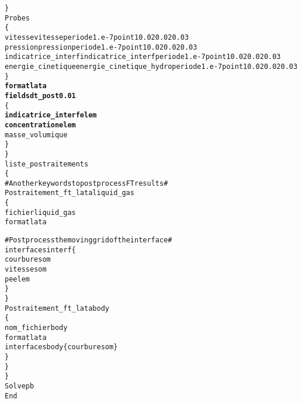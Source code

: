 \begin{alltt}
        \}
        Probes 
        \{
            vitesse vitesse periode 1.e-7 point 1 0.02 0.02 0.03
            pression pression periode 1.e-7 point 1 0.02 0.02 0.03
            indicatrice_interf indicatrice_interf periode 1.e-7 point 1 0.02 0.02 0.03
            energie_cinetique energie_cinetique_hydro periode 1.e-7 point 1 0.02 0.02 0.03
        \}
        {\bf{format lata}}
        {\bf{fields dt_post 0.01 }}
        \{
            {\bf{indicatrice_interf elem}}
            {\bf{concentration elem}}
            masse_volumique
        \}
    \}
    liste_postraitements
    \{
        # Another keywords to post process FT results #
        Postraitement_ft_lata liquid_gas
        \{
            fichier liquid_gas
            format lata
            
            # Post process the moving grid of the interface #
            interfaces interf \{
                courbure som
                vitesse som
                pe elem
            \}
        \}
        Postraitement_ft_lata body
        \{
            nom_fichier body
            format lata
            interfaces body \{ courbure som \}
        \}
    \}
\}
Solve pb
End
\end{alltt}
